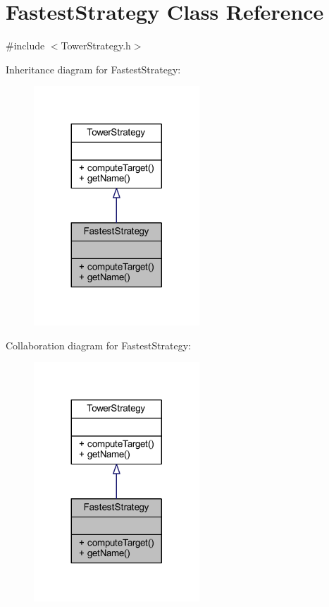\hypertarget{class_fastest_strategy}{\section{Fastest\+Strategy Class Reference}
\label{class_fastest_strategy}
}


{\ttfamily \#include $<$Tower\+Strategy.\+h$>$}



Inheritance diagram for Fastest\+Strategy\+:\nopagebreak
\begin{figure}[H]
\begin{center}
\leavevmode
\includegraphics[width=176pt]{class_fastest_strategy__inherit__graph}
\end{center}
\end{figure}


Collaboration diagram for Fastest\+Strategy\+:\nopagebreak
\begin{figure}[H]
\begin{center}
\leavevmode
\includegraphics[width=176pt]{class_fastest_strategy__coll__graph}
\end{center}
\end{figure}
